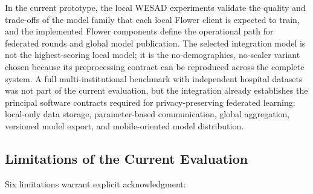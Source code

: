 \documentclass[12pt]{article}
\begin{document}
In the current prototype, the local WESAD experiments validate the quality and trade-offs of the model family that each local Flower client is expected to train, and the implemented Flower components define the operational path for federated rounds and global model publication. The selected integration model is not the highest-scoring local model; it is the no-demographics, no-scaler variant chosen because its preprocessing contract can be reproduced across the complete system. A full multi-institutional benchmark with independent hospital datasets was not part of the current evaluation, but the integration already establishes the principal software contracts required for privacy-preserving federated learning: local-only data storage, parameter-based communication, global aggregation, versioned model export, and mobile-oriented model distribution.

\FloatBarrier

\subsection{Limitations of the Current Evaluation}

Six limitations warrant explicit acknowledgment:
\end{document}
